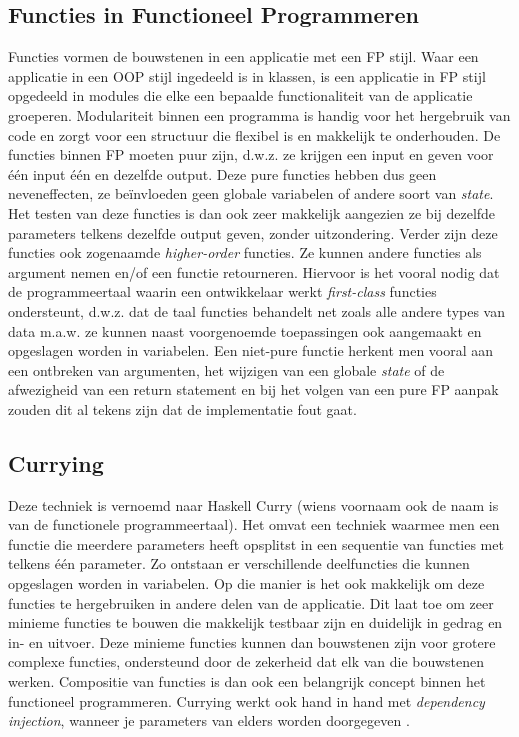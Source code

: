 \subsection{Functies in Functioneel Programmeren}
Functies vormen de bouwstenen in een applicatie met een FP stijl. Waar een applicatie in een OOP stijl ingedeeld is in klassen, is een applicatie in FP stijl opgedeeld in modules die elke een bepaalde functionaliteit van de applicatie groeperen. Modulariteit binnen een programma is handig voor het hergebruik van code en zorgt voor een structuur die flexibel is en makkelijk te onderhouden. 
De functies binnen FP moeten puur zijn, d.w.z. ze krijgen een input en geven voor één input één en dezelfde output. Deze pure functies hebben dus geen neveneffecten, ze beïnvloeden geen globale variabelen of andere soort van \textit{state}. Het testen van deze functies is dan ook zeer makkelijk aangezien ze bij dezelfde parameters telkens dezelfde output geven, zonder uitzondering.
Verder zijn deze functies ook zogenaamde \textit{higher-order} functies. Ze kunnen andere functies als argument nemen en/of een functie retourneren. Hiervoor is het vooral nodig dat de programmeertaal waarin een ontwikkelaar werkt \textit{first-class} functies ondersteunt, d.w.z. dat de taal functies behandelt net zoals alle andere types van data m.a.w. ze kunnen naast voorgenoemde toepassingen ook aangemaakt en opgeslagen worden in variabelen. Een niet-pure functie herkent men vooral aan een ontbreken van argumenten, het wijzigen van een globale \textit{state} of de afwezigheid van een return statement en bij het volgen van een pure FP aanpak zouden dit al tekens zijn dat de implementatie fout gaat.

\subsection{Currying}
Deze techniek is vernoemd naar Haskell Curry (wiens voornaam ook de naam is van de functionele programmeertaal). Het omvat een techniek waarmee men een functie die meerdere parameters heeft opsplitst in een sequentie van functies met telkens één parameter. Zo ontstaan er verschillende deelfuncties die kunnen opgeslagen worden in variabelen. Op die manier is het ook makkelijk om deze functies te hergebruiken in andere delen van de applicatie. Dit laat toe om zeer minieme functies te bouwen die makkelijk testbaar zijn en duidelijk in gedrag en in- en uitvoer. Deze minieme functies kunnen dan bouwstenen zijn voor grotere complexe functies, ondersteund door de zekerheid dat elk van die bouwstenen werken. Compositie van functies is dan ook een belangrijk concept binnen het functioneel programmeren. Currying werkt ook hand in hand met \textit{dependency injection}, wanneer je parameters van elders worden doorgegeven \autocite{Microsoft2019}.

